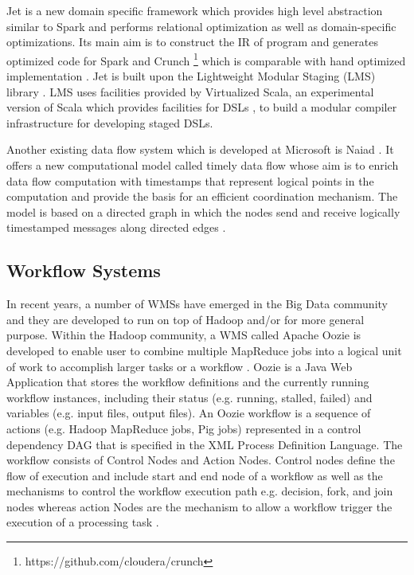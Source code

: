 Jet is a new domain specific framework which provides high level abstraction similar to Spark and performs relational optimization as well as domain-specific optimizations. Its main aim is to construct the IR of program and generates optimized code for Spark and Crunch \footnote{https://github.com/cloudera/crunch} which is comparable with hand optimized implementation \cite{ackermann2012jet}. Jet is built upon the Lightweight Modular Staging (LMS) library \cite{rompf2010lightweight}. LMS uses facilities provided by Virtualized Scala, an experimental version of Scala which provides facilities for DSLs \cite{moors2012scala}, to build a modular compiler infrastructure for developing staged DSLs. 

Another existing data flow system which is developed at Microsoft is Naiad \cite{murray2013naiad}. It offers a new computational model called timely data flow whose aim is to enrich data flow computation with timestamps that represent logical points in the computation and provide the basis for an efficient coordination mechanism. The model is based on a directed graph in which the nodes send and receive logically timestamped messages along directed edges \cite{murray2013naiad}. 

\subsection{Workflow Systems}\label{sec:rwwf}
In recent years, a number of WMSs have emerged in the Big Data community and they are developed to run on top of Hadoop and/or for more general purpose. Within the Hadoop community, a WMS called Apache Oozie is developed to enable user to combine multiple MapReduce jobs into a logical unit of work to accomplish larger tasks or a workflow \cite{islam2012oozie}. Oozie is a Java Web Application that stores the workflow definitions and the currently running workflow instances, including their status (e.g. running, stalled, failed) and variables (e.g. input files, output files). An Oozie workflow is a sequence of actions (e.g. Hadoop MapReduce jobs, Pig jobs) represented in a control dependency DAG that is specified in the XML Process Definition Language. The workflow consists of Control Nodes and Action Nodes. Control nodes define the flow of execution and include start and end node of a workflow as well as the mechanisms to control the workflow execution path e.g. decision, fork, and join nodes whereas action Nodes are the mechanism to allow a workflow trigger the execution of a processing task \cite{islam2012oozie}. 

